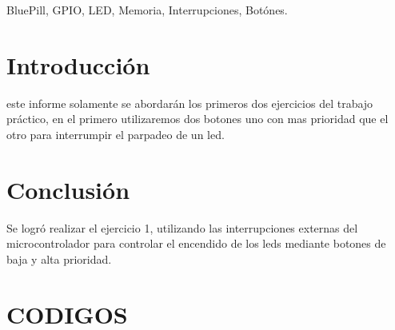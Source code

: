 \documentclass{plantilla}
\begin{document}
\maketitle

\begin{abstract}
En este informe se abordará el desarrollo del trabajo práctico Nro 2, en el cual experimentaremos con las interrupciones externas del microcontrolador STM32F103C8T6, utilizando la placa BluePill. Se desarrollaran los primeros dos ejercicios del trabajo práctico.
\end{abstract}

\begin{IEEEkeywords}
BluePill, GPIO, LED, Memoria, Interrupciones, Botónes.
\end{IEEEkeywords}

\section{Introducción}
 este informe solamente se abordarán los primeros dos ejercicios del trabajo práctico, en el primero utilizaremos dos botones uno con mas prioridad que el otro para interrumpir el parpadeo de un led.



\section{Conclusión}
Se logró realizar el ejercicio 1, utilizando las interrupciones externas del microcontrolador para controlar el encendido de los leds mediante botones de baja y alta prioridad.
\newpage
\section{CODIGOS}


\end{document}

